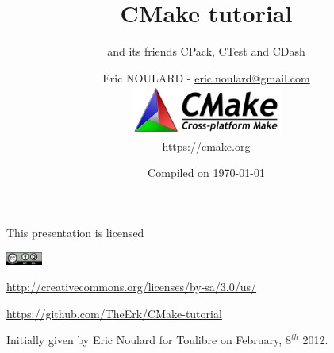 \documentclass[compress,slidestop,table
              ]
               {beamer}
\begin{document}


\title{CMake tutorial}
\subtitle{and its friends CPack, CTest and CDash}
\author[Eric NOULARD - \url{eric.noulard@gmail.com}]{Eric NOULARD - \url{eric.noulard@gmail.com}\\
        \includegraphics[width=5cm]{figures/CMake-logo-small}\\
        \url{https://cmake.org}}
\date{Compiled on \today}
\subject{Slides for CMake, CPack, CTest, CDash presentation. In english.}

\begin{frame}
\titlepage
\begin{center}
{\tiny
This presentation is licensed

\includegraphics[width=1.2cm]{figures/by-sa}

\url{http://creativecommons.org/licenses/by-sa/3.0/us/}

\url{https://github.com/TheErk/CMake-tutorial}

Initially given by Eric Noulard for Toulibre on February, $8^{th}$ 2012.
}
\end{center}
\end{frame}
\end{document}
